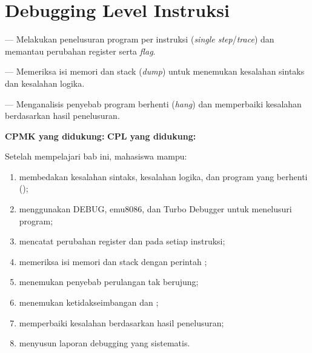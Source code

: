 \documentclass[../../main.tex]{subfiles}
\begin{document}
\chapter{Debugging Level Instruksi}
\label{chap:debugging}


\begin{subcpmkbox}
\vspace{1.1em}
 --- Melakukan penelusuran program per instruksi
(\textit{single step}/\textit{trace}) dan memantau perubahan register
serta \textit{flag}.

\vspace{0.4em}
 --- Memeriksa isi memori dan stack (\textit{dump}) untuk
menemukan kesalahan sintaks dan kesalahan logika.

\vspace{0.4em}
 --- Menganalisis penyebab program berhenti
(\textit{hang}) dan memperbaiki kesalahan berdasarkan hasil
penelusuran.

\vspace{0.4em}
\textbf{CPMK yang didukung:}  \quad\textbullet\quad
\textbf{CPL yang didukung:} 
\end{subcpmkbox}

\begin{tujuanbox}
\vspace{1.1em}
Setelah mempelajari bab ini, mahasiswa mampu:
\begin{enumerate}
    \item membedakan kesalahan sintaks, kesalahan logika, dan
          program yang berhenti ();
    \item menggunakan DEBUG, emu8086, dan Turbo Debugger untuk
          menelusuri program;
    \item mencatat perubahan register dan  pada setiap
          instruksi;
    \item memeriksa isi memori dan stack dengan perintah
          ;
    \item menemukan penyebab perulangan tak berujung;
    \item menemukan ketidakseimbangan  dan ;
    \item memperbaiki kesalahan berdasarkan hasil penelusuran;
    \item menyusun laporan debugging yang sistematis.
\end{enumerate}
\end{tujuanbox}
\end{document}
